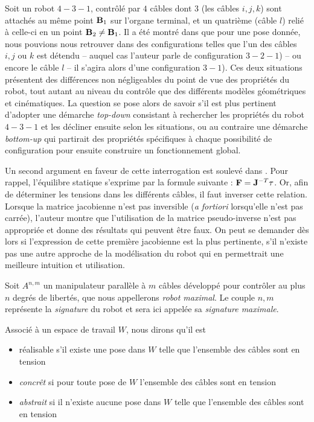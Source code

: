 Soit un robot $4-3-1$, contrôlé par $4$ câbles dont $3$ (les câbles $i, j, k$) 
sont attachés au même point ${\bf B}_1$ sur l'organe terminal, et un quatrième 
(câble $l$) relié à celle-ci en un point ${\bf B}_2 \neq {\bf B}_1$. Il a été 
montré dans \cite{merlet2013-431} que pour une pose donnée, nous pouvions 
nous 
retrouver dans des configurations telles que l'un des câbles $i, j$ ou $k$ est 
détendu -- auquel cas l'auteur parle de configuration $3-2-1$) -- ou encore le 
câble $l$ -- il s'agira alors d'une configuration $3-1$). Ces deux situations 
présentent des différences non négligeables du point de vue des propriétés du 
robot, tout autant au niveau du contrôle que des différents modèles géométriques 
et cinématiques. La question se pose alors de savoir s'il est plus pertinent 
d'adopter une démarche {\it top-down} consistant à rechercher les propriétés du 
robot $4-3-1$ et les décliner ensuite selon les situations, ou au contraire une 
démarche {\it bottom-up} qui partirait des propriétés spécifiques à chaque 
possibilité de configuration pour ensuite construire un fonctionnement global.

Un second argument en faveur de cette interrogation est soulevé 
dans \cite{merlet2012}. Pour rappel, l'équilibre statique s'exprime par la 
formule suivante : $\mathcal {\bf F} = {\bf J}^{-T} {\bf \tau}$. Or, afin de 
déterminer les tensions dans les différents câbles, il faut inverser cette 
relation. Lorsque la matrice jacobienne n'est pas inversible ({\it a fortiori} 
lorsqu'elle n'est pas carrée), l'auteur montre que l'utilisation de la matrice 
pseudo-inverse n'est pas appropriée et donne des résultats qui peuvent être 
faux. On peut se demander dès lors si l'expression de cette première jacobienne 
est la plus pertinente, s'il n'existe pas une autre approche de la modélisation 
du robot qui en permettrait une meilleure intuition et utilisation.

Soit $A^{n, m}$ un manipulateur parall\`ele \`a $m$ c\^ables d\'evelopp\'e pour 
contr\^oler au plus $n$ degr\'es de libert\'es, que nous appellerons {\it 
robot maximal}. Le couple ${n, m}$ repr\'esente la {\it signature} du robot et 
sera ici appel\'ee sa {\it signature maximale}.

Associ\'e à un espace de travail $W$, nous dirons qu'il est
\begin{itemize}
 \item {r\'ealisable} s'il existe une pose dans $W$ telle que l'ensemble des 
c\^ables sont en tension
  \item {\it concr\^et} si pour toute pose de $W$ l'ensemble des c\^ables sont 
en tension
  \item {\it abstrait} si il n'existe aucune pose dans $W$ telle que l'ensemble 
des c\^ables sont en tension
\end{itemize}

